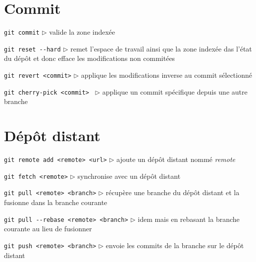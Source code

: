 \documentclass[a4paper,oneside,twocolumn]{article}
\begin{document}
\vspace{-3mm}
\section{Commit}
\vspace{-2mm}

\noindent\verb?git commit?\linebreak
$\triangleright$ valide la zone indexée


\noindent\verb?git reset --hard?\linebreak
$\triangleright$ remet l'espace de travail ainsi que la zone indexée das l'état du dépôt et donc efface les modifications non commitées

\noindent\verb?git revert <commit>?\linebreak
$\triangleright$ applique les modifications inverse au commit sélectionné

\noindent\verb?git cherry-pick <commit> ?\linebreak
$\triangleright$ applique un commit spécifique depuis une autre branche

\vspace{-3mm}
\section{Dépôt distant}
\vspace{-2mm}

\noindent\verb?git remote add <remote> <url>?\linebreak
$\triangleright$ ajoute un dépôt distant nommé \textit{remote}

\noindent\verb?git fetch <remote>?\linebreak
$\triangleright$ synchronise avec un dépôt distant%

\noindent\verb?git pull <remote> <branch>?\linebreak
$\triangleright$ récupère une branche du dépôt distant et la fusionne dans la branche courante

\noindent\verb?git pull --rebase <remote> <branch>?\linebreak
$\triangleright$ idem mais en rebasant la branche courante au lieu de fusionner

\noindent\verb?git push <remote> <branch>?\linebreak
$\triangleright$ envoie les commits de la branche sur le dépôt distant
\end{document}
